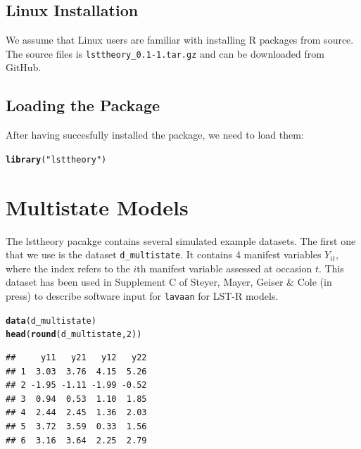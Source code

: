\documentclass[10pt]{article}\usepackage[]{graphicx}\usepackage[]{xcolor}
\makeatletter
\newcommand{\hlnum}[1]{\textcolor[rgb]{0.686,0.059,0.569}{#1}}%
\newcommand{\hlstr}[1]{\textcolor[rgb]{0.192,0.494,0.8}{#1}}%
\newcommand{\hlstd}[1]{\textcolor[rgb]{0.345,0.345,0.345}{#1}}%
\newcommand{\hlkwd}[1]{\textcolor[rgb]{0.737,0.353,0.396}{\textbf{#1}}}%
\newenvironment{kframe}{%
 \def\at@end@of@kframe{}%
 \ifinner\ifhmode%
  \def\at@end@of@kframe{\end{minipage}}%
  \begin{minipage}{\columnwidth}%
 \fi\fi%
 \def\FrameCommand##1{\hskip\@totalleftmargin \hskip-\fboxsep
 \colorbox{shadecolor}{##1}\hskip-\fboxsep
     \hskip-\linewidth \hskip-\@totalleftmargin \hskip\columnwidth}%
 \MakeFramed {\advance\hsize-\width
   \@totalleftmargin\z@ \linewidth\hsize
   \@setminipage}}%
 {\par\unskip\endMakeFramed%
 \at@end@of@kframe}
\newenvironment{knitrout}{}{} %
\makeatother
\begin{document}
\subsection{Linux Installation}

We assume that Linux users are familiar with installing \textsf{R} packages from source. The source files is \texttt{lsttheory\_0.1-1.tar.gz} and can be downloaded from GitHub. 

\subsection{Loading the Package}

After having succesfully installed the package, we need to load them:
%
\begin{knitrout}
\color{fgcolor}\begin{kframe}
\begin{alltt}
\hlkwd{library}\hlstd{(}\hlstr{"lsttheory"}\hlstd{)}
\end{alltt}


{\ttfamily\noindent\itshape\color{messagecolor}{\#\# Lade nötiges Paket: lavaan}}

{\ttfamily\noindent\itshape\color{messagecolor}{\#\# This is lavaan 0.6-15\\\#\# lavaan is FREE software! Please report any bugs.}}\end{kframe}
\end{knitrout}
%

\newpage
\section{Multistate Models}

The lsttheory pacakge contains several simulated example datasets. The first one that we use is the dataset \texttt{d_multistate}. It contains 4 manifest variables $Y_{it}$, where the index refers to the $i$th manifest variable assessed at occasion $t$. This dataset has been used in Supplement C of Steyer, Mayer, Geiser \& Cole (in press) to describe software input for \texttt{lavaan} for LST-R models.
%
\begin{knitrout}
\color{fgcolor}\begin{kframe}
\begin{alltt}
\hlkwd{data}\hlstd{(d_multistate)}
\hlkwd{head}\hlstd{(}\hlkwd{round}\hlstd{(d_multistate,}\hlnum{2}\hlstd{))}
\end{alltt}
\begin{verbatim}
##     y11   y21   y12   y22
## 1  3.03  3.76  4.15  5.26
## 2 -1.95 -1.11 -1.99 -0.52
## 3  0.94  0.53  1.10  1.85
## 4  2.44  2.45  1.36  2.03
## 5  3.72  3.59  0.33  1.56
## 6  3.16  3.64  2.25  2.79
\end{verbatim}
\end{kframe}
\end{knitrout}
%
\end{document}
